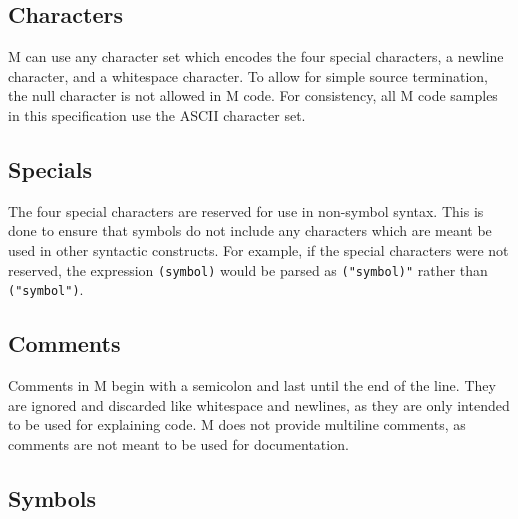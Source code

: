 \documentclass{article}
\newcommand{\comm}[1]{}
\begin{document}
    \begin{multicols}{\comm{2}}
        \subsection{Characters}\label{subsec:characters}

        \begin{minipage}{\columnwidth}
            M can use any character set which encodes the four special characters, a newline character, and a whitespace character.
            To allow for simple source termination, the null character is not allowed in M code.
            For consistency, all M code samples in this specification use the ASCII character set.
        \end{minipage}

        \subsection{Specials}\label{subsec:specials}

        \begin{minipage}{\columnwidth}
            The four special characters are reserved for use in non-symbol syntax.
            This is done to ensure that symbols do not include any characters which are meant be used in other syntactic constructs.
            For example, if the special characters were not reserved, the expression \texttt{(symbol)} would be parsed as \texttt{("symbol)"} rather than \texttt{("symbol")}.
        \end{minipage}

        \subsection{Comments}\label{subsec:comments}

        \begin{minipage}{\columnwidth}
            Comments in M begin with a semicolon and last until the end of the line.
            They are ignored and discarded like whitespace and newlines, as they are only intended to be used for explaining code.
            M does not provide multiline comments, as comments are not meant to be used for documentation.
        \end{minipage}

        \subsection{Symbols}\label{subsec:symbols}


\end{multicols}
\end{document}
